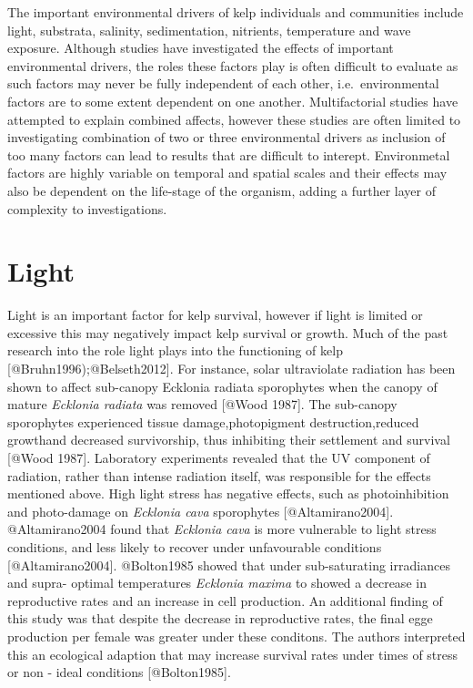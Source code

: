 \documentclass[]{article}
\begin{document}
The important environmental drivers of kelp individuals and communities
include light, substrata, salinity, sedimentation, nitrients,
temperature and wave exposure. Although studies have investigated the
effects of important environmental drivers, the roles these factors play
is often difficult to evaluate as such factors may never be fully
independent of each other, i.e.~environmental factors are to some extent
dependent on one another. Multifactorial studies have attempted to
explain combined affects, however these studies are often limited to
investigating combination of two or three environmental drivers as
inclusion of too many factors can lead to results that are difficult to
interept. Environmetal factors are highly variable on temporal and
spatial scales and their effects may also be dependent on the life-stage
of the organism, adding a further layer of complexity to investigations.

\section{Light}\label{light}

Light is an important factor for kelp survival, however if light is
limited or excessive this may negatively impact kelp survival or growth.
Much of the past research into the role light plays into the functioning
of kelp {[}@Bruhn1996);@Belseth2012{]}. For instance, solar ultraviolate
radiation has been shown to aﬀect sub-canopy Ecklonia radiata
sporophytes when the canopy of mature \emph{Ecklonia radiata} was
removed {[}@Wood 1987{]}. The sub-canopy sporophytes experienced tissue
damage,photopigment destruction,reduced growthand decreased
survivorship, thus inhibiting their settlement and survival {[}@Wood
1987{]}. Laboratory experiments revealed that the UV component of
radiation, rather than intense radiation itself, was responsible for the
eﬀects mentioned above. High light stress has negative eﬀects, such as
photoinhibition and photo-damage on \emph{Ecklonia cava} sporophytes
{[}@Altamirano2004{]}. @Altamirano2004 found that \emph{Ecklonia cava}
is more vulnerable to light stress conditions, and less likely to
recover under unfavourable conditions {[}@Altamirano2004{]}. @Bolton1985
showed that under sub-saturating irradiances and supra- optimal
temperatures \emph{Ecklonia maxima} to showed a decrease in reproductive
rates and an increase in cell production. An additional ﬁnding of this
study was that despite the decrease in reproductive rates, the ﬁnal egge
production per female was greater under these conditons. The authors
interpreted this an ecological adaption that may increase survival rates
under times of stress or non - ideal conditions {[}@Bolton1985{]}.
\end{document}
